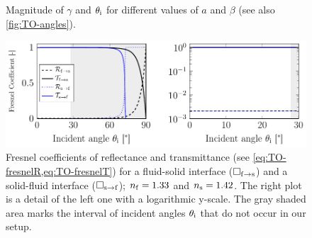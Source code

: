 \begin{figure}
\begin{subfigure}[b]{0.45\textwidth}
    \caption{}
    \label{fig:TO-theta_i}
  \end{subfigure}
    \caption{Magnitude of $\gamma$ and $\theta_{\mathrm{i}}$ for different values of $a$ 
    and $\beta$ (see also \cref{fig:TO-angles}).}
  \label{fig:TO-gamma_theta}
\end{figure}

\begin{figure}[tbp]
  \centering
  \includegraphics[]{External/Fresnel.pdf}
  \caption{Fresnel coefficients of reflectance and transmittance (see 
    \cref{eq:TO-fresnelR,eq:TO-fresnelT}) for a fluid-solid interface 
    ($\Box_{\mathrm{f}\rightarrow\mathrm{s}}$) and a solid-fluid interface 
    ($\Box_{\mathrm{s}\rightarrow\mathrm{f}}$); $n_{\mathrm{f}}=1.33$ and $n_{\mathrm{s}}=1.42$. The right 
    plot is a detail of the left one with a logarithmic y-scale. The gray 
    shaded area marks the interval of incident angles $\theta_{\mathrm{i}}$ that do not 
  occur in our setup.}
  \label{fig:TO-fresnel}
\end{figure}

